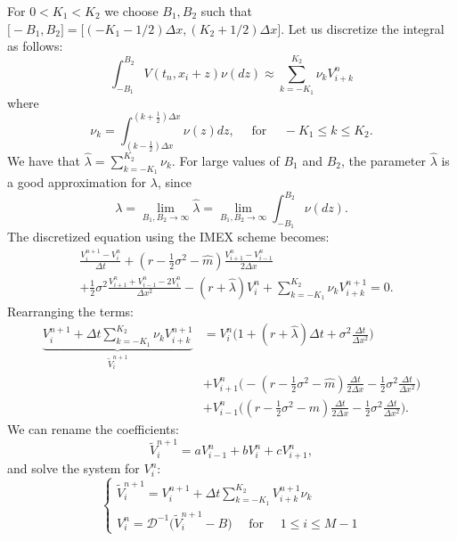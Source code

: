 For $0 < K_1 < K_2$ we choose $B_1,B_2$ such that $ \bigl[-B_1,B_2\bigr] = \bigl[ ( -K_1-1/2 )\Delta x , ( K_2+1/2 )\Delta x \bigr] $.
Let us discretize the integral as follows:
\begin{equation}\label{trap_quad}
 \int_{-B_1}^{B_2}  V(t_n,x_i+z) \nu(dz) \approx \sum_{k = -K_1}^{K_2} \nu_k V^{n}_{i+k}
\end{equation}
where
\begin{equation}\label{nu1}
 \nu_k = \int_{(k-\frac{1}{2}) \Delta x}^{(k+\frac{1}{2}) \Delta x} \nu(z) dz, \hspace{1em} \mbox{ for } \hspace{1em} -K_1 \leq k \leq K_2. 
\end{equation}
We have that $ \hat \lambda = \sum_{k = -K_1}^{K_2} \nu_k $. For large values of $B_1$ and $B_2$, the parameter $\hat \lambda$ is a good approximation for $\lambda$, since
$$\lambda = \lim_{B_1,B_2 \to \infty} \hat \lambda = \lim_{B_1,B_2 \to \infty} \int_{-B_1}^{B_2} \nu(dz).$$
The discretized equation using the IMEX scheme becomes: 
\begin{align}
&\frac{V^{n+1}_{i} -V^{n}_{i}}{\Delta t} + 
(r-\frac{1}{2}\sigma^2 - \hat m) \frac{V^{n}_{i+1} -V^{n}_{i-1}}{ 2 \Delta x} \\ \nonumber
&+ \frac{1}{2} \sigma^2 \frac{V^{n}_{i+1} + V^{n}_{i-1} - 2 V^{n}_{i}}{\Delta x^2}  - (r+\hat \lambda) V^{n}_i +\sum_{k = -K_1}^{K_2} \nu_k V^{n+1}_{i+k} = 0.
\end{align}
Rearranging the terms: 
\begin{align*}
\underbrace{ V^{n+1}_{i} + \Delta t \sum_{k = -K_1}^{K_2} \nu_k V^{n+1}_{i+k} }_{\tilde V^{n+1}_i} &= 
	V^{n}_{i} \biggl( 1 + (r+\hat \lambda)\Delta t + \sigma^2 \frac{\Delta t}{\Delta x^2} \biggr)  \\
& + V^{n}_{i+1} \biggl( -(r -\frac{1}{2}\sigma^2 -\hat m )\frac{\Delta t}{2 \Delta x} -
\frac{1}{2}\sigma^2 \frac{\Delta t}{\Delta x^2}  \biggr)  \\
& + V^{n}_{i-1} \biggl( (r -\frac{1}{2}\sigma^2 - \hat m)\frac{\Delta t}{2 \Delta x} - 
\frac{1}{2}\sigma^2 \frac{\Delta t}{\Delta x^2}  \biggr).
\end{align*}
We can rename the coefficients:
$$ \tilde V^{n+1}_{i} = a V^{n}_{i-1} + b V^{n}_{i} + c V^{n}_{i+1}, $$
and solve the system for $V^{n}_{i}$:
\begin{equation*}
 \begin{cases}
  \tilde V^{n+1}_i = V^{n+1}_{i} + \Delta t \sum_{k = -K_1}^{K_2} V^{n+1}_{i+k} \nu_k \\
  V^{n}_{i} = \mathcal{D}^{-1} \biggl( \tilde V^{n+1}_{i} - B \biggr) \quad \mbox{ for } \quad 1 \leq i \leq M-1  
 \end{cases}
\end{equation*}
